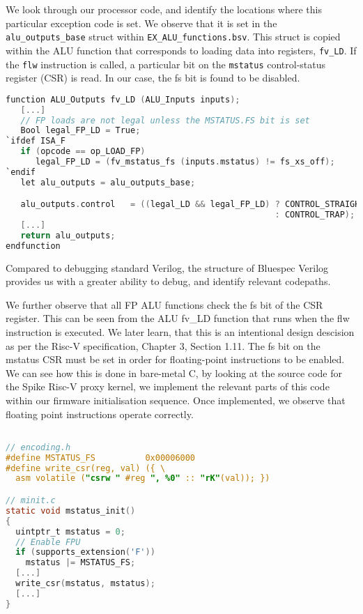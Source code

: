 \documentclass[a4paper,9pt]{report}
\begin{document}
We look through our processor code, and identify the locations where this
particular exception code is set. We observe that it is set in the
\texttt{alu\_outputs\_base} struct within \texttt{EX\_ALU\_functions.bsv}. This
struct is copied within the ALU function that corresponds to loading data into
registers, \texttt{fv\_LD}. If the \texttt{flw} instruction is called, a
particular bit on the \texttt{mstatus} control-status register (CSR) is read. In
our case, the fs bit is found to be disabled.
\begin{lstlisting}[language=C,style=customc]
function ALU_Outputs fv_LD (ALU_Inputs inputs);
   [...]
   // FP loads are not legal unless the MSTATUS.FS bit is set
   Bool legal_FP_LD = True;
`ifdef ISA_F
   if (opcode == op_LOAD_FP)
      legal_FP_LD = (fv_mstatus_fs (inputs.mstatus) != fs_xs_off);
`endif
   let alu_outputs = alu_outputs_base;

   alu_outputs.control   = ((legal_LD && legal_FP_LD) ? CONTROL_STRAIGHT
                                                      : CONTROL_TRAP);
   [...]
   return alu_outputs;
endfunction
\end{lstlisting}

Compared to debugging standard Verilog, the structure of Bluespec Verilog
provides us with a greater ability to debug, and identify relevant codepaths.

We further observe that all FP ALU functions check the fs bit of the CSR register.
This can be seen from the ALU fv\_LD function that runs when the flw instruction
is executed. We later learn, that this is an intentional design descision as per
the Risc-V specification, Chapter 3, Section 1.11. The fs bit on the mstatus CSR must be
set in order for floating-point instructions to be enabled. We can see how this
is done in bare-metal C, by looking at the source code for the Spike Risc-V
proxy kernel, we implement the relevant parts of this code within our firmware
initialisation sequence. Once implemented, we observe that floating point
instructions operate correctly.
\begin{lstlisting}[language=C,style=customc]

// encoding.h
#define MSTATUS_FS          0x00006000
#define write_csr(reg, val) ({ \
  asm volatile ("csrw " #reg ", %0" :: "rK"(val)); })

// minit.c
static void mstatus_init()
{
  uintptr_t mstatus = 0;
  // Enable FPU
  if (supports_extension('F'))
    mstatus |= MSTATUS_FS;
  [...]
  write_csr(mstatus, mstatus);
  [...]
}

\end{lstlisting}
\end{document}
